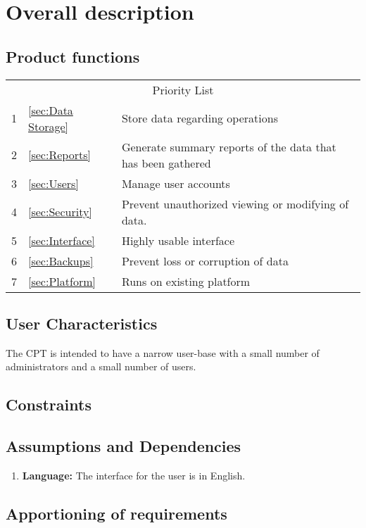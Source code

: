 \documentclass[12pt]{article}
\begin{document}
\section{Overall description}
\subsection{Product functions}

\begin{tabular}{l | l p{5.25in}}
\multicolumn{3}{c}{Priority List}\\
1 &\ref{sec:Data Storage}		& Store data regarding operations \\
2 &\ref{sec:Reports}			& Generate summary reports of the data that has been gathered\\
3 &\ref{sec:Users}				& Manage user accounts\\
4 &\ref{sec:Security}			& Prevent unauthorized viewing or modifying of data. \\
5 &\ref{sec:Interface}			& Highly usable interface\\ 
6 &\ref{sec:Backups}			& Prevent loss or corruption of data\\
7 &\ref{sec:Platform}			& Runs on existing platform\\
\end{tabular}

\subsection{User Characteristics}
The CPT is intended to have a narrow user-base with a small number of administrators and a small number of users.

\subsection{Constraints}


\subsection{Assumptions and Dependencies}
\begin{enumerate}
\item \textbf{Language:} The interface for the user is in English.
\end{enumerate}

\subsection{Apportioning of requirements}
\end{document}
